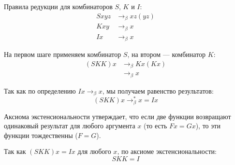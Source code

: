 \documentclass{article}
\begin{document}
Правила редукции для комбинаторов $S$, $K$ и $I$:
\begin{align*}
S x y z &\rightarrow_\beta x z (y z) \\
K x y &\rightarrow_\beta x \\
I x &\rightarrow_\beta x
\end{align*}

На первом шаге применяем комбинатор $S$, на втором — комбинатор $K$:
\begin{align*}
(S K K) x &\rightarrow_\beta K x (K x) \\
&\rightarrow_\beta x
\end{align*}

Так как по определению $I x \rightarrow_\beta x$, мы получаем равенство результатов:
\[ (S K K) x \rightarrow_\beta^* x = I x \]

Аксиома экстенсиональности утверждает, что если две функции возвращают одинаковый результат для любого аргумента $x$ (то есть $F x = G x$), то эти функции тождественны ($F = G$).

Так как $(S K K) x = I x$ для любого $x$, по аксиоме экстенсиональности:
\[ S K K = I \]
\end{document}
